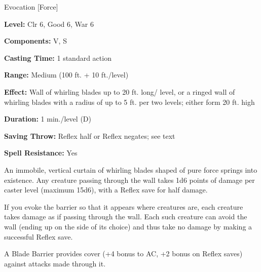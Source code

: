 
Evocation [Force]

\textbf{Level:} Clr 6, Good 6, War 6

\textbf{Components:} V, S

\textbf{Casting Time:} 1 standard action

\textbf{Range:} Medium (100 ft. + 10 ft./level)

\textbf{Effect:} Wall of whirling blades up to 20 ft. long/ level, or a ringed 
wall of whirling blades with a radius of up to 5 ft. per two levels; either form 
20 ft. high

\textbf{Duration:} 1 min./level (D)

\textbf{Saving Throw:} Reflex half or Reflex negates; see text

\textbf{Spell Resistance:} Yes

An immobile, vertical curtain of whirling blades shaped of pure force springs into 
existence. Any creature passing through the wall takes 1d6 points of damage per 
caster level (maximum 15d6), with a Reflex save for half damage.

If you evoke the barrier so that it appears where creatures are, each creature 
takes damage as if passing through the wall. Each such creature can avoid the wall 
(ending up on the side of its choice) and thus take no damage by making a successful 
Reflex save.

A Blade Barrier provides cover (+4 bonus to AC, +2 bonus on Reflex saves) 
against attacks made through it.

